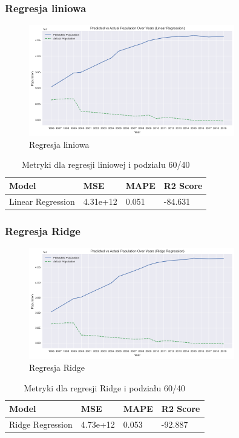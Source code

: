 \documentclass[11pt]{article}
\begin{document}
\subsubsection{Regresja liniowa}
\begin{figure}[H]
        \centering
        \includegraphics[width=0.8\textwidth]{images/linear996.png}
        \caption{Regresja liniowa}
\end{figure}
\begin{table}[H]
        \centering
        \begin{tabular}{|l|l|l|l|}
        \hline
        Model & MSE & MAPE & R2 Score \\ \hline
        Linear Regression & 4.31e+12 & 0.051 & -84.631 \\ \hline
        \end{tabular}
        \caption{Metryki dla regresji liniowej i podziału 60/40}
        \end{table}
\subsubsection{Regresja Ridge}
\begin{figure}[H]
        \centering
        \includegraphics[width=0.8\textwidth]{images/ridge996.png}
        \caption{Regresja Ridge}
\end{figure}
\begin{table}[H]
        \centering
        \begin{tabular}{|l|l|l|l|}
        \hline
        Model & MSE & MAPE & R2 Score \\ \hline
        Ridge Regression & 4.73e+12 & 0.053 & -92.887 \\ \hline
        \end{tabular}
        \caption{Metryki dla regresji Ridge i podziału 60/40}
        \end{table}
\end{document}
